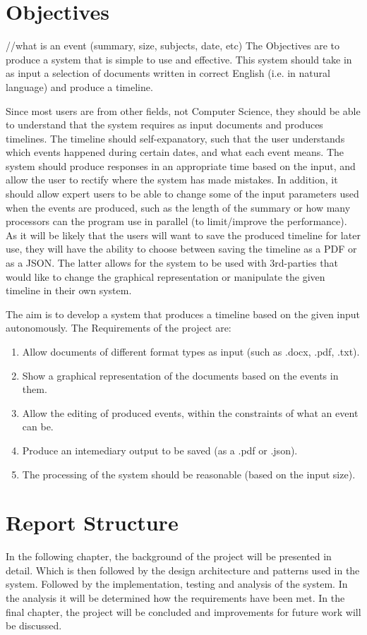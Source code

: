 \documentclass[11pt]{informatics-report}
\begin{document}
\section{Objectives}
//what is an event (summary, size, subjects, date, etc)
The Objectives are to produce a system that is simple to use and effective. This system should take in as input a selection of documents written in correct English (i.e. in natural language) and produce a timeline.\par
Since most users are from other fields, not Computer Science, they should be able to understand that the system requires as input documents and produces timelines. The timeline should self-expanatory, such that the user understands which events happened during certain dates, and what each event means. The system should produce responses in an appropriate time based on the input, and allow the user to rectify where the system has made mistakes. In addition, it should allow expert users to be able to change some of the input parameters used when the events are produced, such as the length of the summary or how many processors can the program use in parallel (to limit/improve the performance). As it will be likely that the users will want to save the produced timeline for later use, they will have the ability to choose between saving the timeline as a PDF or as a JSON. The latter allows for the system to be used with 3rd-parties that would like to change the graphical representation or manipulate the given timeline in their own system.\par 
The aim is to develop a system that produces a timeline based on the given input autonomously. The Requirements of the project are:
\begin{enumerate}
	\item Allow documents of different format types as input (such as .docx, .pdf, .txt).
	\item Show a graphical representation of the documents based on the events in them.
	\item Allow the editing of produced events, within the constraints of what an event can be.
	\item Produce an intemediary output to be saved (as a .pdf or .json).
	\item The processing of the system should be reasonable (based on the input size).
\end{enumerate}
\section{Report Structure}
In the following chapter, the background of the project will be presented in detail. Which is then followed by the design architecture and patterns used in the system. Followed by the implementation, testing and analysis of the system. In the analysis it will be determined how the requirements have been met. In the final chapter, the project will be concluded and improvements for future work will be discussed.
\end{document}
